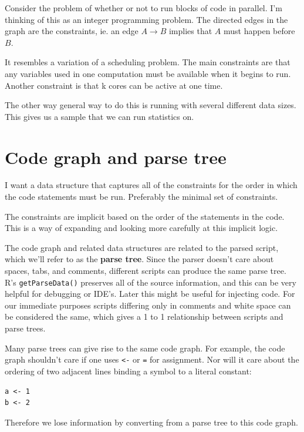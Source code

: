 \documentclass[12pt]{article}
\begin{document}
Consider the problem of whether or not to run blocks of code in parallel.
I'm thinking of this as an integer programming problem. 
The directed edges in the graph are the constraints, ie. an edge $A
\rightarrow B$ implies that $A$ must happen before $B$.

It resembles a
variation of a scheduling problem. The main constraints are that any variables
used in one computation must be available when it begins to run. Another
constraint is that k cores can be active at one time.

The other way general way to do this is running with several different data sizes. This
gives us a sample that we can run statistics on.

\section{Code graph and parse tree }

I want a data structure that captures all of the constraints for the order
in which the code statements must be run. Preferably the minimal
set of constraints.

The constraints are implicit based on the order of the statements in the
code. This is a way of expanding and looking more carefully at this
implicit logic.

The code graph and related data structures are related to the parsed
script, which we'll refer to as the \textbf{parse tree}. Since the parser
doesn't care about spaces, tabs, and comments,  different scripts can produce the same parse
tree. R's \texttt{getParseData()} preserves all of the source
information, and this can be very helpful for debugging or IDE's. Later
this might be useful for injecting code.
For our immediate purposes scripts differing only in comments and white space can be
considered the same, which gives a 1 to 1 relationship between scripts and
parse trees. 

Many parse trees can give rise to the same code graph. For
example, the code graph shouldn't care if one uses \texttt{<-} or
\texttt{=} for assignment. Nor will it care about the ordering of two
adjacent lines binding a symbol to a literal constant:

\begin{verbatim}
a <- 1
b <- 2
\end{verbatim}

Therefore we lose information by converting from a parse tree to this code
graph.
\end{document}
